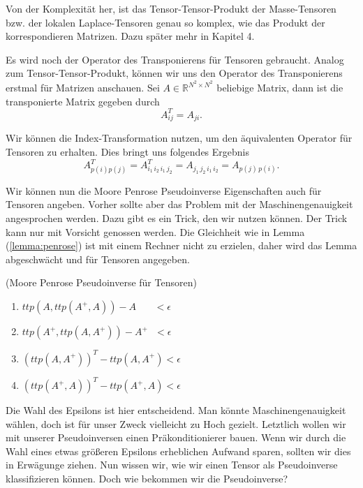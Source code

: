 Von der Komplexität her, ist das Tensor-Tensor-Produkt der Masse-Tensoren bzw. der lokalen Laplace-Tensoren genau so komplex, wie das Produkt der korrespondieren Matrizen. Dazu später mehr in Kapitel 4.

Es wird noch der Operator des Transponierens für Tensoren gebraucht. Analog zum Tensor-Tensor-Produkt, können wir uns den Operator des Transponierens erstmal für Matrizen anschauen.
Sei $A \in \mathbb{R}^{N^2 \times N^2}$ beliebige Matrix, dann ist die transponierte Matrix gegeben durch
\begin{equation}
A_{ij}^T = A_{ji}.
\end{equation}

Wir können die Index-Transformation nutzen, um den äquivalenten Operator für Tensoren zu erhalten. Dies bringt uns folgendes Ergebnis
\begin{equation}
A_{p(i)p(j)}^T=A_{i_1 \, i_2 \, i_1 \, j_2}^T=A_{ j_1 \, j_2 \, i_1 \, i_2}=A_{p(j) \,p(i)}.
\end{equation}

Wir können nun die Moore Penrose Pseudoinverse Eigenschaften auch für Tensoren angeben. Vorher sollte aber das Problem mit der Maschinengenauigkeit angesprochen werden. 
Dazu gibt es ein Trick, den wir nutzen können. Der Trick kann nur mit Vorsicht genossen werden. Die Gleichheit wie in Lemma (\ref{lemma:penrose}) ist mit einem Rechner nicht zu erzielen, daher wird das Lemma abgeschwächt und für Tensoren angegeben. 
\begin{Lemma} (Moore Penrose Pseudoinverse für Tensoren) \label{lemma:tpinv}
\begin{enumerate}
\item $ttp(A,ttp(A^{+},A))-A \, \, \, \, \, \, \, \, \, \, \, < \epsilon$
\item $ttp(A^{+},ttp(A,A^{+}))-A^{+} \, \,  \, \, < \epsilon $ 
\item $(ttp(A,A^{+}))^{T}-ttp(A,A^{+}) < \epsilon $ 
\item $(ttp(A^{+},A))^{T}-ttp(A^{+},A) < \epsilon $ 
\end{enumerate}
\end{Lemma}

Die Wahl des Epsilons ist hier entscheidend. Man könnte Maschinengenauigkeit wählen, doch ist für unser Zweck vielleicht zu Hoch gezielt. Letztlich wollen wir mit unserer Pseudoinversen einen Präkonditionierer bauen. Wenn wir durch die Wahl eines etwas größeren Epsilons erheblichen Aufwand sparen, sollten wir dies in Erwägunge ziehen.
Nun wissen wir, wie wir einen Tensor als Pseudoinverse klassifizieren können. Doch wie bekommen wir die Pseudoinverse?


